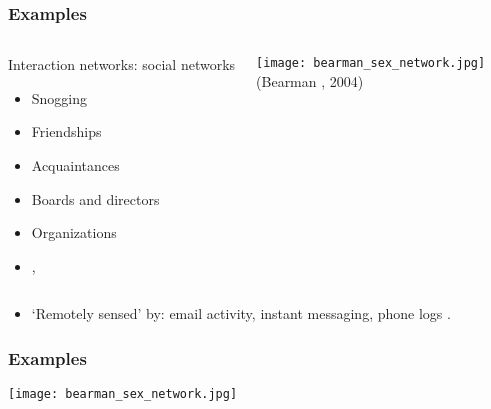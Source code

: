 \begin{frame}
  \frametitle{Examples}

  \begin{columns}
    \begin{block}{Interaction networks: social networks}
      \begin{itemize}
      \item<1-> Snogging
      \item<2-> Friendships
      \item<3-> Acquaintances
      \item<4-> Boards and directors
      \item<5-> Organizations %
      \item<6-> 
        ,
      \end{itemize}
    \end{block}
    \texttt{[image: bearman\_sex\_network.jpg]}\\
    {\tiny (Bearman \etal, 2004)} 
  \end{columns}

  \begin{block}{}
    \begin{itemize}
    \item<7->
      `Remotely sensed' by:
      email activity, 
      instant messaging, 
      phone logs .
    \end{itemize}
  \end{block}

\end{frame}

\begin{frame}
  \frametitle{Examples}

    \texttt{[image: bearman\_sex\_network.jpg]}\\

\end{frame}

